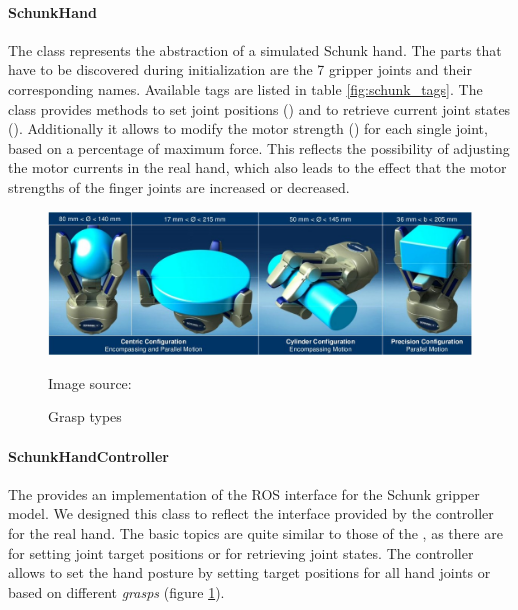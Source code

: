 \paragraph{SchunkHand}

The  class represents the abstraction of a simulated Schunk hand. The parts that have to be discovered during initialization are the 7 gripper joints and their corresponding names. Available tags are listed in table \ref{fig:schunk_tags}. The  class provides methods to set joint positions () and to retrieve current joint states (). Additionally it allows to modify the motor strength () for each single joint, based on a percentage of maximum force. This reflects the possibility of adjusting the motor currents in the real hand, which also leads to the effect that the motor strengths of the finger joints are increased or decreased.

\begin{figure}[h]
	\centering
  	\includegraphics[width=1.0\textwidth]{images/grasp_types.jpg}
	\caption{Grasp types}
	{\scriptsize Image source: \cite{schunk2010}}
	\label{fig:grasp_types}
\end{figure}

\paragraph{SchunkHandController}

The  provides an implementation of the ROS interface for the Schunk gripper model. We designed this class to reflect the interface provided by the controller for the real hand. The basic topics are quite similar to those of the , as there are  for setting joint target positions or  for retrieving joint states. The controller allows to set the hand posture by setting target positions for all hand joints or based on different \emph{grasps} (figure \ref{fig:grasp_types}). \\

